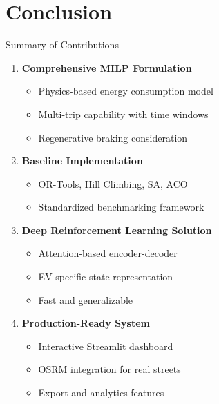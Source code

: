 \documentclass[aspectratio=169,11pt]{beamer}
\begin{document}
\section{Conclusion}

\begin{frame}{Summary of Contributions}
    \begin{enumerate}
        \item \textbf{Comprehensive MILP Formulation}
        \begin{itemize}
            \item Physics-based energy consumption model
            \item Multi-trip capability with time windows
            \item Regenerative braking consideration
        \end{itemize}
        
        \vspace{0.3cm}
        \item \textbf{Baseline Implementation}
        \begin{itemize}
            \item OR-Tools, Hill Climbing, SA, ACO
            \item Standardized benchmarking framework
        \end{itemize}
        
        \vspace{0.3cm}
        \item \textbf{Deep Reinforcement Learning Solution}
        \begin{itemize}
            \item Attention-based encoder-decoder
            \item EV-specific state representation
            \item Fast and generalizable
        \end{itemize}
        
        \vspace{0.3cm}
        \item \textbf{Production-Ready System}
        \begin{itemize}
            \item Interactive Streamlit dashboard
            \item OSRM integration for real streets
            \item Export and analytics features
        \end{itemize}
    \end{enumerate}
\end{frame}
\end{document}
